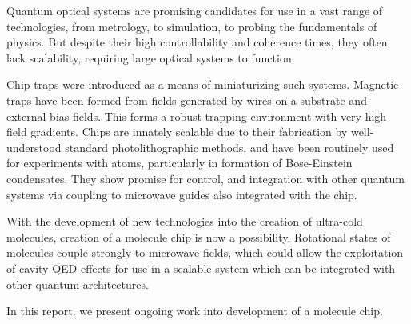 Quantum optical systems are promising candidates for use in a vast range of
technologies, from metrology, to simulation, to probing the fundamentals of
physics. But despite their high controllability and coherence times, they often
lack scalability, requiring large optical systems to function.

Chip traps were introduced as a means of miniaturizing such systems. Magnetic
traps have been formed from fields generated by wires on a substrate and
external bias fields. This forms a robust trapping environment with very high
field gradients. Chips are innately scalable due to their fabrication by
well-understood standard photolithographic methods, and have been
routinely used for experiments with atoms, particularly in formation of
Bose-Einstein condensates. They show promise for control, and integration with
other quantum systems via coupling to microwave guides also integrated with the
chip.

With the development of new technologies into the creation of ultra-cold
molecules, creation of a molecule chip is now a possibility. Rotational states
of molecules couple strongly to microwave fields, which could allow the
exploitation of cavity QED effects for use in a scalable system which can be
integrated with other quantum architectures.

In this report, we present ongoing work into development of a molecule chip.
